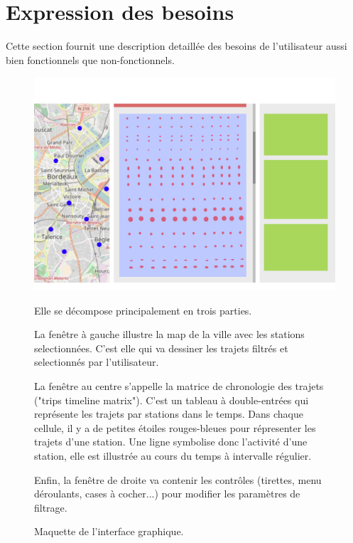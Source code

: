 \documentclass[12pt]{article}
\begin{document}
	\section{Expression des besoins}
		Cette section fournit une description detaillée des besoins de l'utilisateur aussi bien fonctionnels que non-fonctionnels.

		\begin{figure}[!ht]
		\includegraphics[scale=.5]{maquette.png}
		\caption{Maquette de l'interface graphique.}
		\medskip
		Elle se décompose principalement en trois parties.\par

		La fenêtre à gauche illustre la map de la ville avec les stations selectionnées.
		C'est elle qui va dessiner les trajets filtrés et selectionnés par l'utilisateur.\par

		La fenêtre au centre s'appelle la matrice de chronologie des trajets ("trips timeline matrix").
		C'est un tableau à double-entrées qui représente les trajets par stations dans le temps.
		Dans chaque cellule, il y a de petites étoiles rouges-bleues pour répresenter les trajets d'une station.
		Une ligne symbolise donc l'activité d'une station, elle est illustrée au cours du temps à intervalle régulier.\par

		Enfin, la fenêtre de droite va contenir les contrôles (tirettes, menu déroulants, cases à cocher...) pour modifier les paramètres de filtrage.
		\end{figure}
\end{document}

